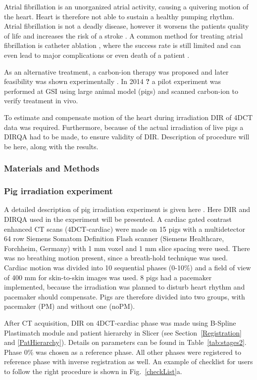 \documentclass[type=dr, dr=rernat, accentcolor=tud7b,colorbacktitle, bigchapter, openright, twoside, 12pt ]{tudthesis}
\begin{document}
Atrial fibrillation is an unorganized atrial activity, causing a quivering motion of the heart. Heart is therefore not able to sustain a healthy pumping rhythm. Atrial fibrillation is not a
deadly disease, however it worsens the patients quality of life and increases the risk of a stroke \cite{Benjamin1998}. A common method for treating atrial fibrillation is catheter ablation \cite{January2014}, 
where the success rate is still limited and can even lead to major complications or even death of a patient \cite{Cappato2005,Cappato2010}.

As an alternative treatment, a carbon-ion therapy was proposed \cite{Bert2012} and later feasibility was shown experimentally \cite{Lehmann2015b}. In 2014 \textbf{?} a pilot experiment was performed at GSI using large animal model (pigs) and
scanned carbon-ion to verify treatment in vivo.

To estimate and compensate motion of the heart during irradiation DIR of 4DCT data was required. Furthermore, because of the actual irradiation of live pigs a DIRQA had to be made, to ensure validity of DIR. Description of procedure will be here,
along with the results.


\subsubsection{Materials and Methods}


\subsubsection{Pig irradiation experiment}

A detailed description of pig irradiation experiment is given here \cite{Lehmann2015}. Here DIR and DIRQA used in the experiment will be presented. A cardiac gated contrast enhanced CT scans (4DCT-cardiac) were made on 15 pigs with a multidetector 64 row Siemens Somatom Definition Flash scanner 
(Siemens Healthcare, Forchheim, Germany) with 1 mm voxel and 1 mm slice spacing were used. There was no breathing motion present, since a breath-hold technique was used. Cardiac motion was divided into 10 sequential phases (0-10\%) and a field of view of 400 mm for skin-to-skin images was used.
8 pigs had a pacemaker implemented, because the irradiation was planned to disturb heart rhythm and pacemaker should compensate. Pigs are therefore divided into two groups, with pacemaker (PM) and without one (noPM).

After CT acquisition, DIR on 4DCT-cardiac phase was made using B-Spline Plastimatch module and patient hierarchy in Slicer (see Section~\ref{Registration} and \ref{PatHierarchy}). Details on parameters can be found in Table~\ref{tab:stages2}. 
Phase 0\% was chosen as a reference phase. All other phases were registered to reference phase with inverse registration as well. An example of checklist for users to follow the right procedure is shown in Fig.~\ref{checkList}a.
\end{document}

